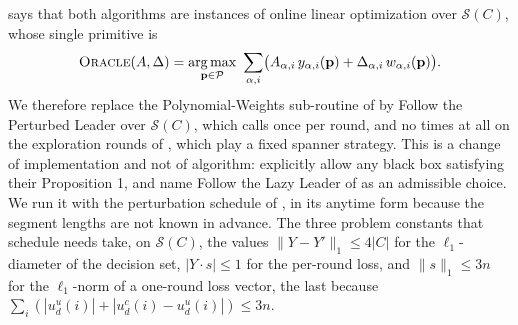 \documentclass[letterpaper,9pt,twocolumn]{extarticle}
\newcommand{\pvec}{\mathbf{p}}
\newcommand{\cP}{\mathcal{P}}
\newcommand{\argmax}{\operatorname*{arg\,max}}
\theoremstyle{plain}
\theoremstyle{definition}
\theoremstyle{remark}
\begin{document}
 says that both algorithms are instances of online linear
optimization over $\mathcal{S}(C)$, whose single primitive is
\begin{equation}
\textsc{Oracle}(A,\Delta)=\argmax_{\pvec\in\cP}\ \sum_{\alpha,i}
\bigl(A_{\alpha,i}\,y_{\alpha,i}(\pvec)+\Delta_{\alpha,i}\,w_{\alpha,i}(\pvec)\bigr).
\label{eq:oracle}
\end{equation}
We therefore replace the Polynomial-Weights sub-routine of
 by Follow the Perturbed Leader over $\mathcal{S}(C)$, which
calls  once per round, and no times at all on the
exploration rounds of , which play a fixed spanner strategy. This is a change of
implementation and not of algorithm: \citet[Section 3.1]{balcan2015}
explicitly allow any black box satisfying their Proposition 1, and name
Follow the Lazy Leader of \citet{kalai2005} as an admissible choice. We run
it with the perturbation schedule of \citet{kalai2005}, in its anytime form
because the segment lengths are not known in advance. The three problem
constants that schedule needs take, on $\mathcal{S}(C)$, the values
$\|Y-Y'\|_1\le 4|C|$ for the $\ell_1$-diameter of the decision set,
$|Y\cdot s|\le 1$ for the per-round loss, and $\|s\|_1\le 3n$ for the
$\ell_1$-norm of a one-round loss vector, the last because
$\sum_i(|u_d^u(i)|+|u_d^c(i)-u_d^u(i)|)\le 3n$.
\end{document}
